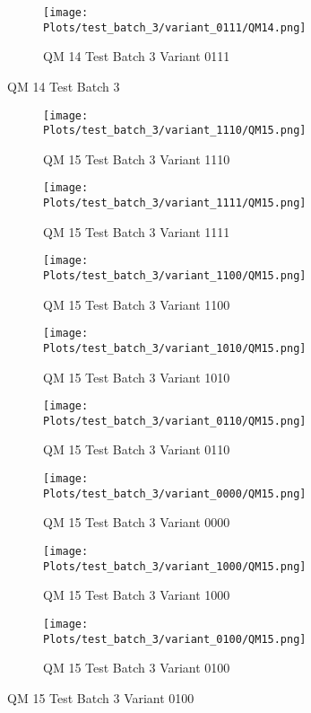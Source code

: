 \documentclass{DissertateFigs}
\begin{document}
\begin{figure}[t!]
\medskip

    \begin{subfigure}{0.47\textwidth}
    \texttt{[image: Plots/test\_batch\_3/variant\_0111/QM14.png]}
    \caption{QM 14 Test Batch 3 Variant 0111}
    \end{subfigure}
\caption{QM 14 Test Batch 3}
    \end{figure}
\clearpage
\begin{figure}[t!]
    \begin{subfigure}{0.32\textwidth}
    \texttt{[image: Plots/test\_batch\_3/variant\_1110/QM15.png]}
    \caption{QM 15 Test Batch 3 Variant 1110}
    \end{subfigure}
    \begin{subfigure}{0.32\textwidth}
    \texttt{[image: Plots/test\_batch\_3/variant\_1111/QM15.png]}
    \caption{QM 15 Test Batch 3 Variant 1111}
    \end{subfigure}

\medskip

    \begin{subfigure}{0.32\textwidth}
    \texttt{[image: Plots/test\_batch\_3/variant\_1100/QM15.png]}
    \caption{QM 15 Test Batch 3 Variant 1100}
    \end{subfigure}
    \begin{subfigure}{0.32\textwidth}
    \texttt{[image: Plots/test\_batch\_3/variant\_1010/QM15.png]}
    \caption{QM 15 Test Batch 3 Variant 1010}
    \end{subfigure}

\medskip

    \begin{subfigure}{0.32\textwidth}
    \texttt{[image: Plots/test\_batch\_3/variant\_0110/QM15.png]}
    \caption{QM 15 Test Batch 3 Variant 0110}
    \end{subfigure}
    \begin{subfigure}{0.32\textwidth}
    \texttt{[image: Plots/test\_batch\_3/variant\_0000/QM15.png]}
    \caption{QM 15 Test Batch 3 Variant 0000}
    \end{subfigure}

\medskip

    \begin{subfigure}{0.32\textwidth}
    \texttt{[image: Plots/test\_batch\_3/variant\_1000/QM15.png]}
    \caption{QM 15 Test Batch 3 Variant 1000}
    \end{subfigure}
    \begin{subfigure}{0.32\textwidth}
    \texttt{[image: Plots/test\_batch\_3/variant\_0100/QM15.png]}
    \caption{QM 15 Test Batch 3 Variant 0100}
    \end{subfigure}


\end{figure}
\end{document}
